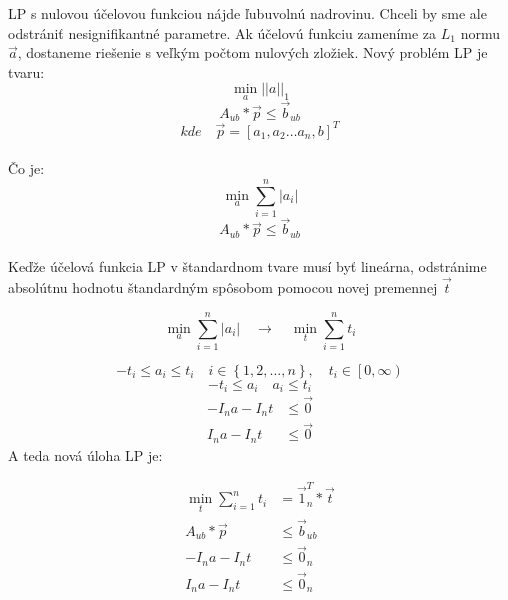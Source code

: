 \documentclass{article}
\begin{document}
LP s nulovou účelovou funkciou nájde ľubuvolnú nadrovinu. Chceli by sme ale odstrániť nesignifikantné parametre. Ak účelovú funkciu zameníme za $L_1$ normu $\Vec{a}$, dostaneme riešenie s veľkým počtom nulových zložiek. Nový problém LP je tvaru:
\\
\[\min_a ||a||_1\]
\[A_{ub} * \Vec{p} \leq \Vec{b}_{ub}\]
\[kde \quad \Vec{p} = [a_1,a_2 \ldots a_{n}, b]^T\]
\\
Čo je:
\\
\[\min_a \sum_{i=1}^{n}{|a_i|}\]
\[A_{ub} * \Vec{p} \leq \Vec{b}_{ub}\]
\\
Keďže účelová funkcia LP v štandardnom tvare musí byť lineárna, odstránime absolútnu hodnotu štandardným spôsobom pomocou novej premennej $\Vec{t}$

 \[\min_a \sum_{i=1}^{n}{|a_i|} \quad \xrightarrow[]{} \quad \min_t \sum_{i=1}^{n}{t_i}\]

\[-t_i \leq a_i \leq t_i \quad i \in \left\{ 1, 2, ..., n\right\}, \quad t_i \in \left[0,\infty\right)\]
\[-t_i \leq a_i \quad a_i \leq t_i\]
\begin{align*}
-I_n a - I_n t &\leq \Vec{0}\\
I_n a - I_n t &\leq \Vec{0}
\end{align*}
\newline\newline\newline\newline
A teda nová úloha LP je:

\begin{align*}
\min_t \sum_{i=1}^{n}{t_i} &= \Vec{1}_n^T * \Vec{t}\\
A_{ub} * \Vec{p} &\leq \Vec{b}_{ub}\\
-I_n a - I_n t &\leq \Vec{0}_n\\
I_na - I_nt &\leq \Vec{0}_n\\ 
\end{align*}
\end{document}
